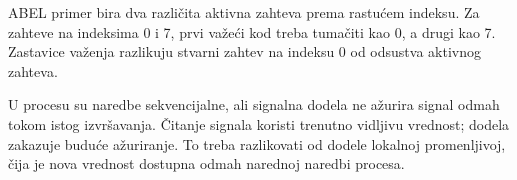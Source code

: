 ABEL primer bira dva različita aktivna zahteva prema rastućem indeksu. Za zahteve na indeksima 0 i 7, prvi važeći kod treba tumačiti kao 0, a drugi kao 7. Zastavice važenja razlikuju stvarni zahtev na indeksu 0 od odsustva aktivnog zahteva.

U procesu su naredbe sekvencijalne, ali signalna dodela ne ažurira signal odmah tokom istog izvršavanja. Čitanje signala koristi trenutno vidljivu vrednost; dodela zakazuje buduće ažuriranje. To treba razlikovati od dodele lokalnoj promenljivoj, čija je nova vrednost dostupna odmah narednoj naredbi procesa.
